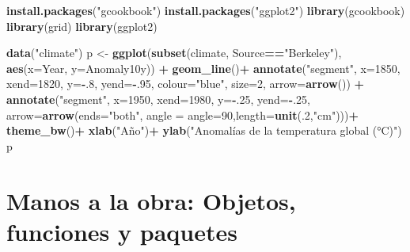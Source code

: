 \documentclass[]{article}
\newenvironment{Shaded}{\begin{snugshade}}{\end{snugshade}}
\newcommand{\DataTypeTok}[1]{\textcolor[rgb]{0.13,0.29,0.53}{#1}}
\newcommand{\DecValTok}[1]{\textcolor[rgb]{0.00,0.00,0.81}{#1}}
\newcommand{\KeywordTok}[1]{\textcolor[rgb]{0.13,0.29,0.53}{\textbf{#1}}}
\newcommand{\NormalTok}[1]{#1}
\newcommand{\OperatorTok}[1]{\textcolor[rgb]{0.81,0.36,0.00}{\textbf{#1}}}
\newcommand{\StringTok}[1]{\textcolor[rgb]{0.31,0.60,0.02}{#1}}
\begin{document}
\begin{Shaded}
\begin{Highlighting}[]
\KeywordTok{install.packages}\NormalTok{(}\StringTok{"gcookbook"}\NormalTok{)}
\KeywordTok{install.packages}\NormalTok{(}\StringTok{"ggplot2"}\NormalTok{)}
\KeywordTok{library}\NormalTok{(gcookbook)}
\KeywordTok{library}\NormalTok{(grid)}
\KeywordTok{library}\NormalTok{(ggplot2)}

\KeywordTok{data}\NormalTok{(}\StringTok{"climate"}\NormalTok{)}
\NormalTok{p <-}\StringTok{ }\KeywordTok{ggplot}\NormalTok{(}\KeywordTok{subset}\NormalTok{(climate, Source}\OperatorTok{==}\StringTok{"Berkeley"}\NormalTok{), }\KeywordTok{aes}\NormalTok{(}\DataTypeTok{x=}\NormalTok{Year, }\DataTypeTok{y=}\NormalTok{Anomaly10y)) }\OperatorTok{+}
\StringTok{      }\KeywordTok{geom_line}\NormalTok{()}\OperatorTok{+}
\StringTok{      }\KeywordTok{annotate}\NormalTok{(}\StringTok{"segment"}\NormalTok{, }\DataTypeTok{x=}\DecValTok{1850}\NormalTok{, }\DataTypeTok{xend=}\DecValTok{1820}\NormalTok{, }\DataTypeTok{y=}\OperatorTok{-}\NormalTok{.}\DecValTok{8}\NormalTok{, }\DataTypeTok{yend=}\OperatorTok{-}\NormalTok{.}\DecValTok{95}\NormalTok{, }\DataTypeTok{colour=}\StringTok{"blue"}\NormalTok{, }\DataTypeTok{size=}\DecValTok{2}\NormalTok{, }\DataTypeTok{arrow=}\KeywordTok{arrow}\NormalTok{()) }\OperatorTok{+}
\StringTok{      }\KeywordTok{annotate}\NormalTok{(}\StringTok{"segment"}\NormalTok{, }\DataTypeTok{x=}\DecValTok{1950}\NormalTok{, }\DataTypeTok{xend=}\DecValTok{1980}\NormalTok{, }\DataTypeTok{y=}\OperatorTok{-}\NormalTok{.}\DecValTok{25}\NormalTok{, }\DataTypeTok{yend=}\OperatorTok{-}\NormalTok{.}\DecValTok{25}\NormalTok{, }\DataTypeTok{arrow=}\KeywordTok{arrow}\NormalTok{(}\DataTypeTok{ends=}\StringTok{"both"}\NormalTok{, }\DataTypeTok{angle =} \DataTypeTok{angle=}\DecValTok{90}\NormalTok{,}\DataTypeTok{length=}\KeywordTok{unit}\NormalTok{(.}\DecValTok{2}\NormalTok{,}\StringTok{"cm"}\NormalTok{)))}\OperatorTok{+}
\StringTok{      }\KeywordTok{theme_bw}\NormalTok{()}\OperatorTok{+}
\StringTok{      }\KeywordTok{xlab}\NormalTok{(}\StringTok{"Año"}\NormalTok{)}\OperatorTok{+}
\StringTok{      }\KeywordTok{ylab}\NormalTok{(}\StringTok{"Anomalías de la temperatura global (°C)"}\NormalTok{)}
\NormalTok{p  }
\end{Highlighting}
\end{Shaded}

\hypertarget{manos-a-la-obra-objetos-funciones-y-paquetes}{%
\section{Manos a la obra: Objetos, funciones y
paquetes}\label{manos-a-la-obra-objetos-funciones-y-paquetes}}
\end{document}
